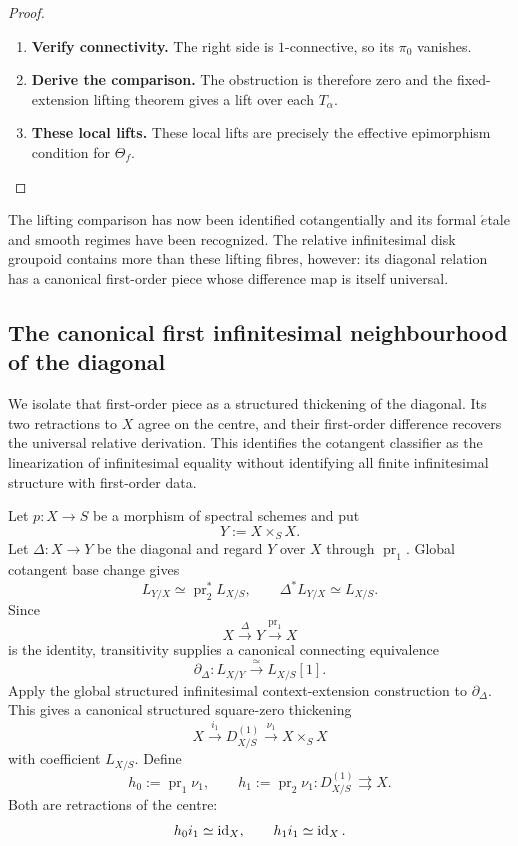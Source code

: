 \begin{proof}
\begin{enumerate}[label=\textup{(\arabic*)}]
    \item \textbf{Verify connectivity.}
    The right side is \(1\)-connective, so its \(\pi_0\) vanishes.

    \item \textbf{Derive the comparison.}
    The obstruction is therefore zero and the fixed-extension lifting theorem gives a lift over
    each \(T_\alpha\).

    \item \textbf{These local lifts.}
    These local lifts are precisely the effective epimorphism condition for \(\Theta_f\).
\end{enumerate}
\end{proof}
The lifting comparison has now been identified cotangentially and its formal
\(\acute{e}\)tale and smooth regimes have been recognized. The relative
infinitesimal disk groupoid contains more than these lifting fibres, however:
its diagonal relation has a canonical first-order piece whose difference map
is itself universal.

\subsection{The canonical first infinitesimal neighbourhood of the diagonal}
\label{sec:first-diagonal-neighbourhood}

We isolate that first-order piece as a structured thickening of the diagonal.
Its two retractions to \(X\) agree on the centre, and their first-order
difference recovers the universal relative derivation. This identifies the
cotangent classifier as the linearization of infinitesimal equality without
identifying all finite infinitesimal structure with first-order data.

\begin{construction}
\label{con:first-diagonal-neighbourhood}
Let \(p:X\to S\) be a morphism of spectral schemes and put
\[
    Y:=X\times_SX.
\]
Let \(\Delta:X\to Y\) be the diagonal and regard \(Y\) over \(X\) through
\(\operatorname{pr}_1\). Global cotangent base change gives
\[
    L_{Y/X}
    \simeq
    \operatorname{pr}_2^*L_{X/S},
    \qquad
    \Delta^*L_{Y/X}
    \simeq
    L_{X/S}.
\]
Since
\[
    X\xrightarrow{\Delta}Y\xrightarrow{\operatorname{pr}_1}X
\]
is the identity, transitivity supplies a canonical connecting equivalence
\[
    \partial_\Delta:
    L_{X/Y}
    \xrightarrow{\simeq}
    L_{X/S}[1].
\]
Apply the global structured infinitesimal context-extension construction to \(\partial_\Delta\). This gives a
canonical structured square-zero thickening
\[
    X
    \xrightarrow{i_1}
    D^{(1)}_{X/S}
    \xrightarrow{\nu_1}
    X\times_SX
\]
with coefficient \(L_{X/S}\). Define
\[
    h_0:=\operatorname{pr}_1\nu_1,
    \qquad
    h_1:=\operatorname{pr}_2\nu_1
    :D^{(1)}_{X/S}\rightrightarrows X.
\]
Both are retractions of the centre:
\[
    h_0i_1\simeq\operatorname{id}_X,
    \qquad
    h_1i_1\simeq\operatorname{id}_X.
\]
\end{construction}

